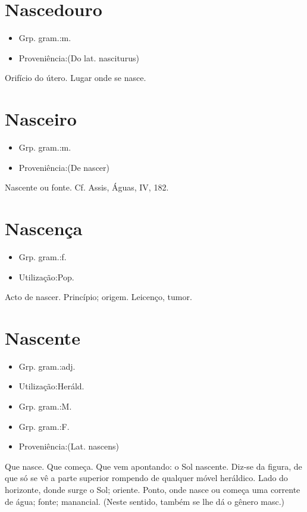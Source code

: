\section{Nascedouro}
\begin{itemize}
\item {Grp. gram.:m.}
\end{itemize}
\begin{itemize}
\item {Proveniência:(Do lat. \textunderscore nasciturus\textunderscore )}
\end{itemize}
Orifício do útero.
Lugar onde se nasce.
\section{Nasceiro}
\begin{itemize}
\item {Grp. gram.:m.}
\end{itemize}
\begin{itemize}
\item {Proveniência:(De \textunderscore nascer\textunderscore )}
\end{itemize}
Nascente ou fonte. Cf. Assis, \textunderscore Águas\textunderscore , IV, 182.
\section{Nascença}
\begin{itemize}
\item {Grp. gram.:f.}
\end{itemize}
\begin{itemize}
\item {Utilização:Pop.}
\end{itemize}
Acto de nascer.
Princípio; origem.
Leicenço, tumor.
\section{Nascente}
\begin{itemize}
\item {Grp. gram.:adj.}
\end{itemize}
\begin{itemize}
\item {Utilização:Heráld.}
\end{itemize}
\begin{itemize}
\item {Grp. gram.:M.}
\end{itemize}
\begin{itemize}
\item {Grp. gram.:F.}
\end{itemize}
\begin{itemize}
\item {Proveniência:(Lat. \textunderscore nascens\textunderscore )}
\end{itemize}
Que nasce.
Que começa.
Que vem apontando: \textunderscore o Sol nascente\textunderscore .
Diz-se da figura, de que só se vê a parte superior rompendo de qualquer móvel heráldico.
Lado do horizonte, donde surge o Sol; oriente.
Ponto, onde nasce ou começa uma corrente de água; fonte; manancial. (Neste sentido, também se lhe dá o gênero masc.)
